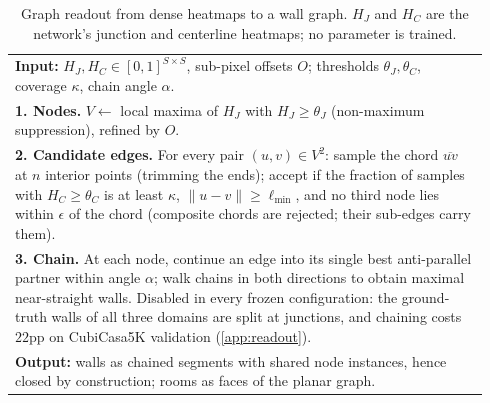 \documentclass{article}
\begin{document}
\begin{table}[t]
\centering
\small
\caption{Graph readout from dense heatmaps to a wall graph. $H_J$ and $H_C$ are
the network's junction and centerline heatmaps; no parameter is trained.}
\label{alg:readout}
\begin{tabular}{p{0.94\linewidth}}
\toprule
\textbf{Input:} $H_J,H_C\in[0,1]^{S\times S}$, sub-pixel offsets $O$; thresholds
$\theta_J,\theta_C$, coverage $\kappa$, chain angle $\alpha$.\\
\textbf{1. Nodes.} $V\leftarrow$ local maxima of $H_J$ with $H_J\ge\theta_J$
(non-maximum suppression), refined by $O$.\\
\textbf{2. Candidate edges.} For every pair $(u,v)\in V^2$: sample the chord
$\overline{uv}$ at $n$ interior points (trimming the ends); accept if the
fraction of samples with $H_C\ge\theta_C$ is at least $\kappa$, $\|u-v\|\ge
\ell_{\min}$, and no third node lies within $\epsilon$ of the chord
(composite chords are rejected; their sub-edges carry them).\\
\textbf{3. Chain.} At each node, continue an edge into its single best
anti-parallel partner within angle $\alpha$; walk chains in both directions to
obtain maximal near-straight walls. Disabled in every frozen configuration: the
ground-truth walls of all three domains are split at junctions, and chaining
costs $22$pp on CubiCasa5K validation (\cref{app:readout}).\\
\textbf{Output:} walls as chained segments with shared node instances, hence
closed by construction; rooms as faces of the planar graph.\\
\bottomrule
\end{tabular}
\end{table}
\end{document}
